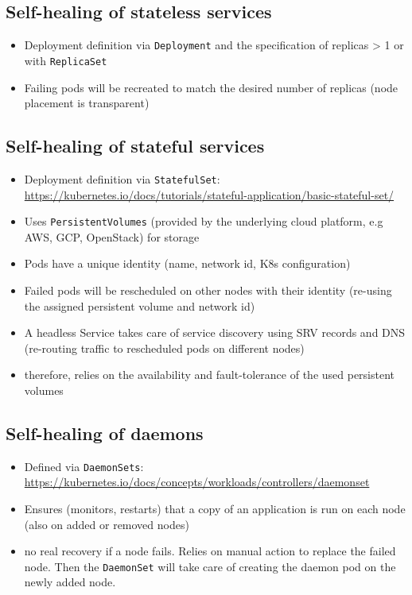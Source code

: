   \subsection{Self-healing of stateless services}
    \begin{itemize}
      \item Deployment definition via \texttt{Deployment} and the specification of replicas > 1 or with \texttt{ReplicaSet}
      \item Failing pods will be recreated to match the desired number of replicas (node placement is transparent)
    \end{itemize}

  \subsection{Self-healing of stateful services}
    \begin{itemize}
      \item Deployment definition via \texttt{StatefulSet}: \url{https://kubernetes.io/docs/tutorials/stateful-application/basic-stateful-set/}
      \item  Uses \texttt{PersistentVolumes} (provided by the underlying cloud platform, e.g AWS, GCP, OpenStack) for storage
      \item Pods have a unique identity (name, network id, K8s configuration)
      \item Failed pods will be rescheduled on other nodes with their identity (re-using the assigned persistent volume and network id)
      \item A headless Service takes care of service discovery using SRV records and DNS (re-routing traffic to rescheduled pods on different nodes)
      \item therefore, relies on the availability and fault-tolerance of the used persistent volumes
    \end{itemize}

  \subsection{Self-healing of daemons}
    \begin{itemize}
      \item Defined via \texttt{DaemonSets}: \url{https://kubernetes.io/docs/concepts/workloads/controllers/daemonset}
      \item Ensures (monitors, restarts) that a copy of an application is run on each node (also on added or removed nodes)
      \item no real recovery if a node fails. Relies on manual action to replace the failed node. Then the \texttt{DaemonSet} will take care of creating the daemon pod on the newly added node.
    \end{itemize}

